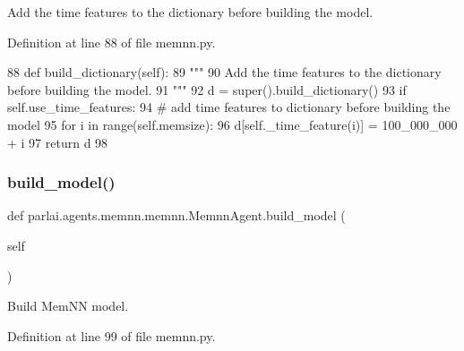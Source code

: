 \begin{DoxyVerb}Add the time features to the dictionary before building the model.
\end{DoxyVerb}
 

Definition at line 88 of file memnn.\+py.


\begin{DoxyCode}
88     \textcolor{keyword}{def }build\_dictionary(self):
89         \textcolor{stringliteral}{"""}
90 \textcolor{stringliteral}{        Add the time features to the dictionary before building the model.}
91 \textcolor{stringliteral}{        """}
92         d = super().build\_dictionary()
93         \textcolor{keywordflow}{if} self.use\_time\_features:
94             \textcolor{comment}{# add time features to dictionary before building the model}
95             \textcolor{keywordflow}{for} i \textcolor{keywordflow}{in} range(self.memsize):
96                 d[self.\_time\_feature(i)] = 100\_000\_000 + i
97         \textcolor{keywordflow}{return} d
98 
\end{DoxyCode}
\mbox{\label{classparlai_1_1agents_1_1memnn_1_1memnn_1_1MemnnAgent_aa5b5782548443a008c0502ec9ddedee2}} 
\subsubsection{\texorpdfstring{build\+\_\+model()}{build\_model()}}
{\footnotesize\ttfamily def parlai.\+agents.\+memnn.\+memnn.\+Memnn\+Agent.\+build\+\_\+model (\begin{DoxyParamCaption}\item[{}]{self }\end{DoxyParamCaption})}

\begin{DoxyVerb}Build MemNN model.
\end{DoxyVerb}
 

Definition at line 99 of file memnn.\+py.


